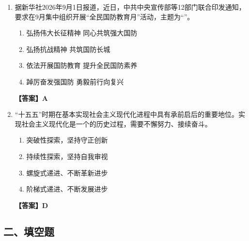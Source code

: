 \documentclass[UTF8,11pt,a4paper]{ctexart}
\begin{document}
\begin{enumerate}[label=\textbf{\arabic*.}, leftmargin=2.5em, itemsep=0.7em]
\begin{enumerate}[label=\Alph*., leftmargin=2em, itemsep=0.1em, topsep=0.15em]
\item 扩大内需
\item 推动高质量发展
\item 防范化解金融风险
\item 促进共同富裕
\end{enumerate}
\textbf{【答案】B}
\item 据新华社2026年9月1日报道，近日，中共中央宣传部等12部门联合印发通知，要求在9月集中组织开展“全民国防教育月”活动，主题为“\allowbreak\underline{\hspace{4em}}”。
\begin{enumerate}[label=\Alph*., leftmargin=2em, itemsep=0.1em, topsep=0.15em]
\item 弘扬伟大长征精神 同心共筑强大国防
\item 弘扬抗战精神 共筑国防长城
\item 依法开展国防教育 提升全民国防素养
\item 踔厉奋发强国防 勇毅前行向复兴
\end{enumerate}
\textbf{【答案】A}
\item “十五五”时期在基本实现社会主义现代化进程中具有承前启后的重要地位。实现社会主义现代化是一个\allowbreak\underline{\hspace{4em}}的历史过程，需要不懈努力、接续奋斗。
\begin{enumerate}[label=\Alph*., leftmargin=2em, itemsep=0.1em, topsep=0.15em]
\item 突破性探索，坚持守正创新
\item 持续性探索，坚持自我审视
\item 螺旋式递进、不断革新进步
\item 阶梯式递进、不断发展进步
\end{enumerate}
\textbf{【答案】D}
\end{enumerate}

\subsection*{二、填空题}
\end{document}
